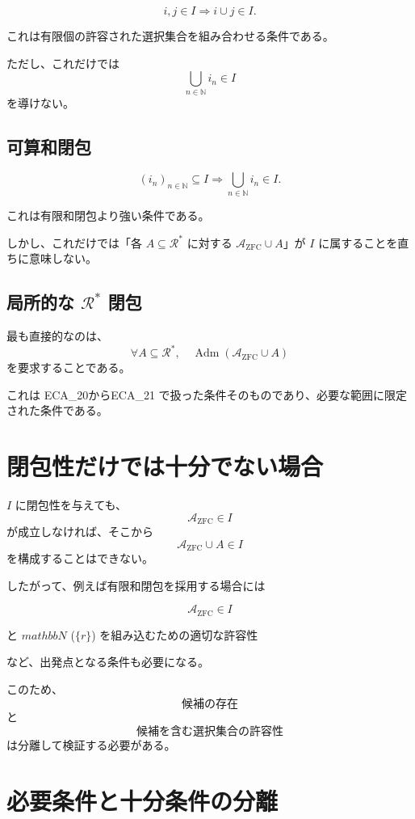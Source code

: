 \documentclass[a4paper,11pt]{article}
\begin{document}
\[
i,j\in I
\Longrightarrow
i\cup j\in I.
\]

これは有限個の許容された選択集合を組み合わせる条件である。

ただし、これだけでは
\[
\bigcup_{n\in\mathbb{N}}i_n\in I
\]
を導けない。

\subsection{可算和閉包}

\[
(i_n)_{n\in\mathbb{N}}\subseteq I
\Longrightarrow
\bigcup_{n\in\mathbb{N}}i_n\in I.
\]

これは有限和閉包より強い条件である。

しかし、これだけでは「各 $A\subseteq\mathcal{R}^*$ に対する $\mathcal{A}_{\mathrm{ZFC}}\cup A$」が $I$ に属することを直ちに意味しない。

\subsection{局所的な $\mathcal{R}^*$ 閉包}

最も直接的なのは、
\[
\boxed{
\forall A\subseteq\mathcal{R}^*,
\quad
\operatorname{Adm}
(\mathcal{A}_{\mathrm{ZFC}}\cup A)
}
\]
を要求することである。

これは ECA_20からECA_21 で扱った条件そのものであり、必要な範囲に限定された条件である。

\section{閉包性だけでは十分でない場合}

$I$ に閉包性を与えても、
\[
\mathcal{A}_{\mathrm{ZFC}}\in I
\]
が成立しなければ、そこから
\[
\mathcal{A}_{\mathrm{ZFC}}\cup A\in I
\]
を構成することはできない。

したがって、例えば有限和閉包を採用する場合には

\[
\mathcal{A}_{\mathrm{ZFC}}\in I
\]

と $mathbb{N}$ ($\{r\}$) を組み込むための適切な許容性

など、出発点となる条件も必要になる。

このため、
\[
\text{候補の存在}
\]
と
\[
\text{候補を含む選択集合の許容性}
\]
は分離して検証する必要がある。

\section{必要条件と十分条件の分離}
\end{document}
